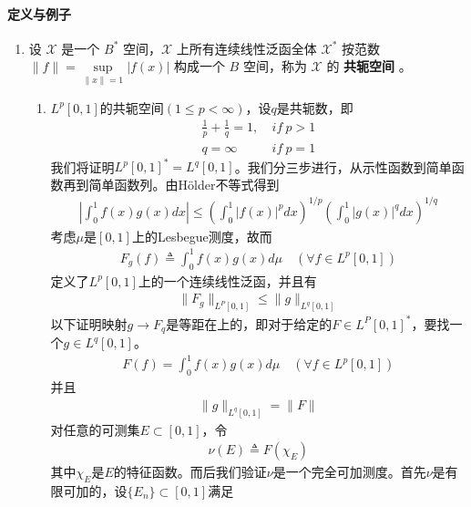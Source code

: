 \paragraph{定义与例子}
\begin{enumerate}[leftmargin=2cm, label=\arabic*]
    \item 设 $\mathscr{X}$ 是一个 $B^*$ 空间，$\mathscr{X}$ 上所有连续线性泛函全体 $\mathscr{X}^*$ 按范数 $\|f\| = \sup\limits_{\|x\| = 1} |f(x)|$ 构成一个 $B$ 空间，称为 $\mathscr{X}$ 的 \textbf{共轭空间} 。
    \begin{enumerate}[leftmargin=1cm, label=(\arabic*)]
        \item $L^p[0,1]$的共轭空间$(1\leqslant p<\infty)$，设$q$是共轭数，即
        \begin{align*}
            \frac{1}{p} + \frac{1}{q} = 1, &\ if\ p>1 \\
            q = \infty &\ if\ p = 1
        \end{align*}
        我们将证明$L^p[0,1]^* = L^q[0,1]$。我们分三步进行，从示性函数到简单函数再到简单函数列。由Hölder不等式得到
        \begin{align*}
            \left|\int_0^1 f(x)g(x) dx \right| \leqslant \left(\int_0^1 |f(x)|^p dx\right)^{1/p} \left(\int_0^1 |g(x)|^q dx \right)^{1/q}
        \end{align*}
        考虑$\mu$是$[0,1]$上的Lesbegue测度，故而
        \begin{align*}
            F_g(f) \triangleq \int_0^1 f(x)g(x)d\mu \quad (\forall f\in L^p[0,1])
        \end{align*}
        定义了$L^p[0,1]$上的一个连续线性泛函，并且有
        \begin{align*}
            \|F_g\|_{L^P[0,1]} \leqslant \|g\|_{L^q[0,1]}
        \end{align*}
        以下证明映射$g\to F_q$是等距在上的，即对于给定的$F\in L^P[0,1]^*$，要找一个$g\in L^q[0,1]$。
        \begin{align*}
            F(f) =\int_0^1 f(x)g(x) d\mu \quad (\forall f\in L^p[0,1])
        \end{align*}
        并且
        \begin{align*}
            \|g\|_{L^q[0,1]} = \|F\|
        \end{align*}
        对任意的可测集$E\subset [0,1]$，令
        \begin{align*}
            \nu(E) \triangleq F(\chi_E)
        \end{align*}
        其中$\chi_E$是$E$的特征函数。而后我们验证$\nu$是一个完全可加测度。首先$\nu$是有限可加的，设$\{E_n\}\subset[0,1]$满足

\end{enumerate}
\end{enumerate}
